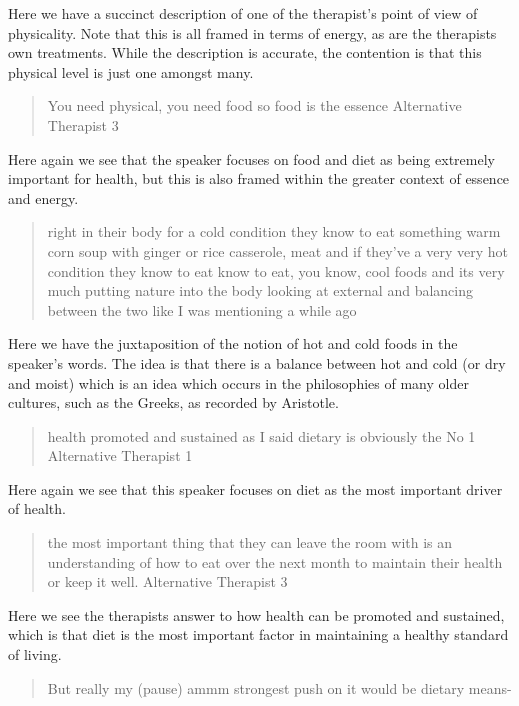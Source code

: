 Here we have a succinct description of one of the therapist's point of view of physicality. Note that this is all framed in terms of energy, as are the therapists own treatments. While the description is accurate, the contention is that this physical level is just one amongst many. 

\begin{quotation}
  You need physical, you need food so food is the essence
Alternative Therapist 3
\end{quotation}

Here again we see that the speaker focuses on food and diet as being extremely important for health, but this is also framed within the greater context of essence and energy. 

\begin{quotation}
 right in their body for a cold condition they know to eat something warm corn soup with ginger or rice casserole, meat and if they've a very very hot condition they know to eat know to eat, you know, cool foods and its very much putting nature into the body looking at external and balancing between the two like I was mentioning a while ago


\end{quotation}

Here we have the juxtaposition of the notion of hot and cold foods in the speaker's words. The idea is that there is a balance between hot and cold (or dry and moist) which is an idea which occurs in the philosophies of many older cultures, such as the Greeks, as recorded by Aristotle. 

\begin{quotation}
   health promoted and sustained as I said dietary is obviously the No 1
Alternative Therapist 1
\end{quotation}

Here again we see that this speaker focuses on diet as the most important driver of health. 


 \begin{quotation}
 the most important thing that they can leave the room with is an understanding of how to eat over the next month to maintain their health or keep it well.    
Alternative Therapist 3
 \end{quotation}

Here we see the therapists answer to how health can be promoted and sustained, which is that diet is the most important factor in maintaining a healthy standard of living. 

\begin{quotation}
  But really my (pause) ammm strongest push on it would be dietary means-

\end{quotation}

